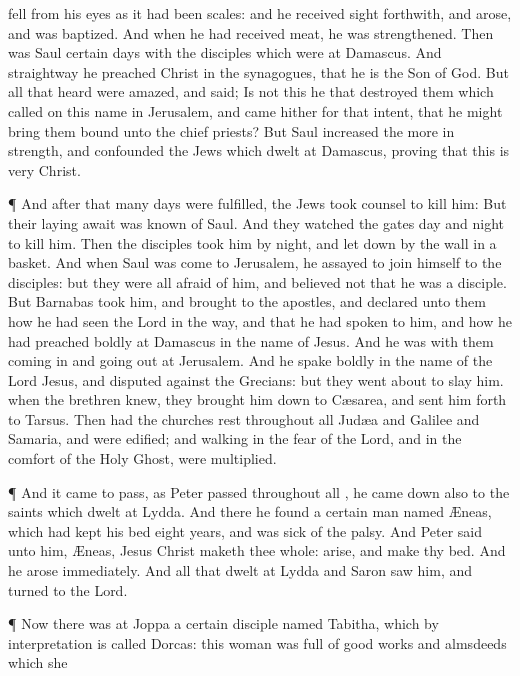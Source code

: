 {fell
from
his
eyes as it had
been
scales:
and he received
sight
forthwith,
and
arose, and was
baptized.
And when he had
received
meat, he was
strengthened.
Then
was
Saul
certain
days
with the
disciples which
were
at
Damascus.
And
straightway he
preached
Christ
in the
synagogues,
that
he
is the
Son of
God.
But
all
that
heard
{} were
amazed,
and
said;
Is
not
this he
that
destroyed them
which called
on
this
name
in
Jerusalem,
and
came
hither
for that
intent,
that he might
bring
them
bound
unto the chief
priests?
But
Saul
increased the
more in
strength,
and
confounded the
Jews
which
dwelt
at
Damascus,
proving
that
this
is
very
Christ.
\par }{\PP {}¶
And after
that
many
days were
fulfilled, the
Jews took
counsel to
kill
him:
But
their laying
await was
known of
Saul.
And they
watched the
gates
day
and
night
to
kill
him.
Then the
disciples
took
him by
night, and
let
{}
down
by the
wall
in a
basket.
And when
Saul was
come
to
Jerusalem, he
assayed to join
himself to the
disciples:
but they
were
all
afraid of
him, and
believed
not
that he
was a
disciple.
But
Barnabas
took
him, and
brought
{}
to the
apostles,
and
declared unto
them
how he had
seen the
Lord
in the
way,
and
that he had spoken
to
him,
and
how he had preached
boldly
at
Damascus
in the
name of
Jesus.
And he
was
with
them coming
in
and going
out
at
Jerusalem.
And he spake
boldly
in the
name of the
Lord
Jesus,
and
disputed
against the
Grecians:
but they went
about to
slay
him.
when the
brethren
knew, they
brought
him
down
to
Cæsarea,
and
sent
him
forth
to
Tarsus.
Then
had the
churches
rest
throughout
all
Judæa
and
Galilee
and
Samaria, and were
edified;
and
walking in the
fear of the
Lord,
and in the
comfort of the
Holy
Ghost, were
multiplied.
\par }{\PP {}¶
And it came to
pass, as
Peter
passed
throughout
all
{}, he came
down
also
to the
saints
which
dwelt at
Lydda.
And
there he
found a
certain
man
named
Æneas,
which had kept
his
bed
eight
years, and
was sick of the
palsy.
And
Peter
said unto
him,
Æneas,
Jesus
Christ
maketh
thee
whole:
arise,
and
make
thy
bed.
And he
arose
immediately.
And
all
that
dwelt at
Lydda
and
Saron
saw
him, and
turned
to the
Lord.
\par }{\PP {}¶
Now there
was
at
Joppa a
certain
disciple
named
Tabitha,
which by
interpretation is
called
Dorcas:
this
woman
was
full of
good
works
and
almsdeeds
which she
}

